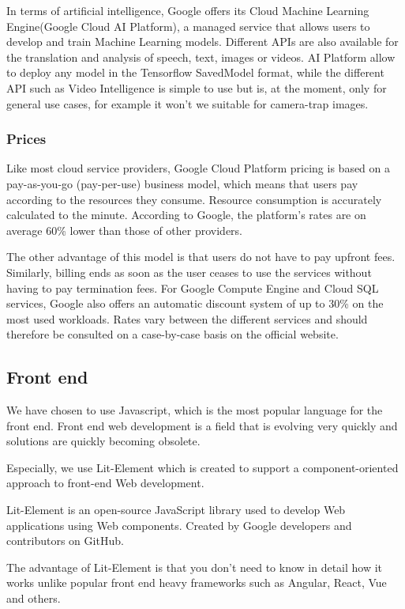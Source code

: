 In terms of artificial intelligence, Google offers its Cloud Machine Learning Engine(Google Cloud AI Platform), a managed service that allows users to develop and train Machine Learning models. Different APIs are also available for the translation and analysis of speech, text, images or videos.
AI Platform allow to deploy any model in the Tensorflow SavedModel format, while the different API such as Video Intelligence is simple to use but is, at the moment, only for general use cases, for example it won't we suitable for camera-trap images.

\subsubsection{Prices}

Like most cloud service providers, Google Cloud Platform pricing is based on a pay-as-you-go (pay-per-use) business model, which means that users pay according to the resources they consume. Resource consumption is accurately calculated to the minute. According to Google, the platform's rates are on average 60\% lower than those of other providers\cite{gcp_pricing}.

The other advantage of this model is that users do not have to pay upfront fees. Similarly, billing ends as soon as the user ceases to use the services without having to pay termination fees. For Google Compute Engine and Cloud SQL services, Google also offers an automatic discount system of up to 30\% on the most used workloads. Rates vary between the different services and should therefore be consulted on a case-by-case basis on the official website.

\pagebreak\subsection{Front end}
We have chosen to use Javascript, which is the most popular language for the front end.
Front end web development is a field that is evolving very quickly and solutions are quickly becoming obsolete.

Especially, we use Lit-Element which is created to support a component-oriented approach to front-end Web development.

Lit-Element is an open-source JavaScript library used to develop Web applications using Web components. Created by Google developers and contributors on GitHub.

The advantage of Lit-Element is that you don't need to know in detail how it works unlike popular front end heavy frameworks such as Angular, React, Vue and others.

